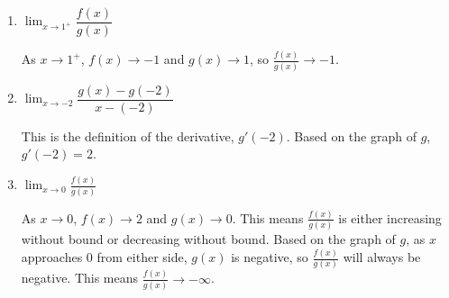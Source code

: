 \documentclass{article}
\begin{document}
\begin{enumerate}
\begin{enumerate}
      \probonly{\columnbreak}

    \item

      \begin{problem}[0.65in]
        $\displaystyle \lim_{x \to 1^+} \dfrac{f(x)}{g(x)}$
      \end{problem}

      \begin{solution}
        As $x \to 1^+$, $f(x) \to -1$ and $g(x) \to 1$, so $\frac{f(x)}{g(x)} \to -1$.
      \end{solution}

    \item


      \begin{problem}[0.65in]
        $\displaystyle \lim_{x \to -2} \dfrac{g(x) - g(-2)}{x - (-2)}$
      \end{problem}

      \begin{solution}
        This is the definition of the derivative, $g'(-2)$. Based on the graph of $g$, $g'(-2)=\boxed{2}$.
      \end{solution}

    \item


      \begin{problem}[0.65in]
        $\displaystyle \lim_{x \to 0} \frac{f(x)}{g(x)}$
      \end{problem}

      \begin{solution}
        As $x \to 0$, $f(x) \to 2$ and $g(x) \to 0$. This means $\frac{f(x)}{g(x)}$ is either increasing
        without bound or decreasing without bound. Based on the graph of $g$, as $x$ approaches $0$ from either
        side, $g(x)$ is negative, so $\frac{f(x)}{g(x)}$ will always be negative. This means $\frac{f(x)}{g(x)} \to
        \boxed{-\infty}$.
      \end{solution}


\end{enumerate}
\end{enumerate}
\end{document}
